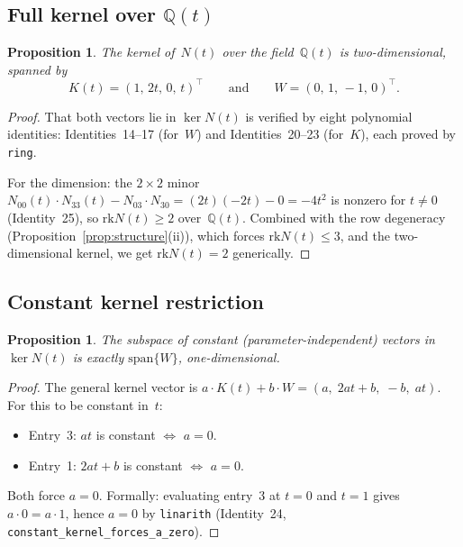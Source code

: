 \documentclass[11pt]{article}
\theoremstyle{plain}
\newtheorem{proposition}[theorem]{Proposition}
\theoremstyle{definition}
\theoremstyle{remark}
\newcommand{\Q}{\mathbb{Q}}
\newcommand{\rk}{\mathrm{rk}}
\begin{document}
\subsection{Full kernel over \texorpdfstring{$\Q(t)$}{Q(t)}}

\begin{proposition}\label{prop:kernel}
The kernel of~$N(t)$ over the field~$\Q(t)$ is
two-dimensional, spanned by
\[
K(t) = (1,\, 2t,\, 0,\, t)^{\!\top}
\qquad\text{and}\qquad
W = (0,\, 1,\, -1,\, 0)^{\!\top}.
\]
\end{proposition}

\begin{proof}
That both vectors lie in $\ker N(t)$ is verified by
eight polynomial identities:
Identities~14--17 (for~$W$) and Identities~20--23 (for~$K$),
each proved by \texttt{ring}.

For the dimension: the $2 \times 2$ minor
$N_{00}(t) \cdot N_{33}(t) - N_{03} \cdot N_{30}
= (2t)(-2t) - 0 = -4t^2$
is nonzero for $t \neq 0$ (Identity~25), so $\rk N(t) \geq 2$
over~$\Q(t)$.  Combined with the row degeneracy
(Proposition~\ref{prop:structure}(ii)), which forces
$\rk N(t) \leq 3$, and the two-dimensional kernel,
we get $\rk N(t) = 2$ generically.
\end{proof}

\subsection{Constant kernel restriction}

\begin{proposition}\label{prop:constant}
The subspace of constant (parameter-independent)
vectors in $\ker N(t)$ is exactly
$\mathrm{span}\{W\}$, one-dimensional.
\end{proposition}

\begin{proof}
The general kernel vector is
$a \cdot K(t) + b \cdot W = (a,\; 2at + b,\; -b,\; at)$.
For this to be constant in~$t$:
\begin{itemize}[nosep]
\item Entry~3: $at$ is constant $\Leftrightarrow$ $a = 0$.
\item Entry~1: $2at + b$ is constant $\Leftrightarrow$ $a = 0$.
\end{itemize}
Both force $a = 0$.
Formally: evaluating entry~3 at $t = 0$ and $t = 1$ gives
$a \cdot 0 = a \cdot 1$, hence $a = 0$ by \texttt{linarith}
(Identity~24, \texttt{constant\_kernel\_forces\_a\_zero}).
\end{proof}
\end{document}
